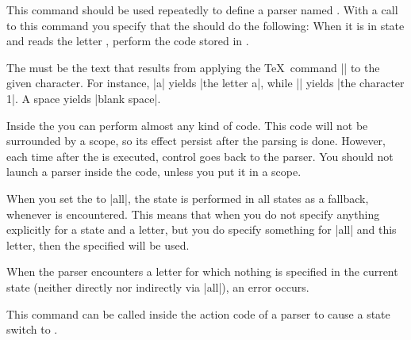 \begin{command}{\pgfparserdef{}}
  This command should be used repeatedly to define a parser named
  . With a call to this command you specify that the
   should do the following: When it is in state
   and reads the letter , perform the
  code stored in .

  The  must be the text that results from
  applying the \TeX\ command |\meaning| to the given character. For
  instance, |\meaning a| yields |the letter a|, while ||
  yields |the character 1|. A space yields |blank space|.

  Inside the  you can perform almost any kind of
  code. This code will not be surrounded by a scope, so its effect
  persist after the parsing is done. However, each time after the
   is executed, control goes back to the parser. You
  should not launch a parser inside the  code, unless you
  put it in a scope.

  When you set the  to |all|, the state  is
  performed in all states as a fallback, whenever  is encountered. This means that when you do not specify
  anything explicitly for a state and a letter, but you do specify
  something for |all| and this letter, then the specified
   will be used.

  When the parser encounters a letter for which nothing is specified
  in the current state (neither directly nor indirectly via |all|), an
  error occurs.
\end{command}

\begin{command}{\pgfparserswitch{}}
  This command can be called inside the action code of a parser to
  cause a state switch to .
\end{command}